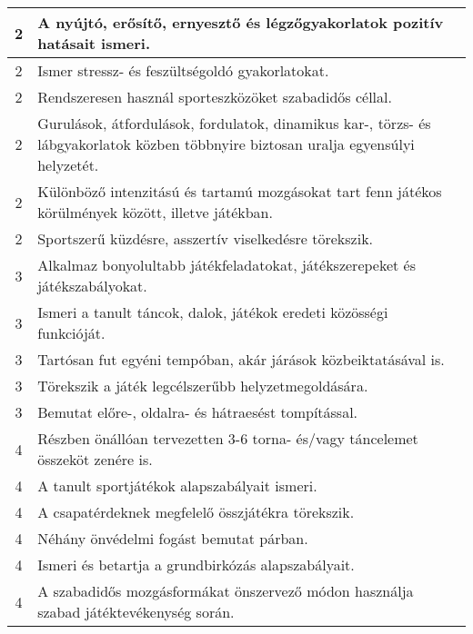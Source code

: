 \begin{longtable}{c | p{} }
                                
                                          2 &  A nyújtó, erősítő, ernyesztő és légzőgyakorlatok pozitív hatásait ismeri. \\ \hline
                                          2 &  Ismer stressz- és feszültségoldó gyakorlatokat. \\ \hline
                                          2 &  Rendszeresen használ sporteszközöket szabadidős céllal. \\ \hline
                                          2 &  Gurulások, átfordulások, fordulatok, dinamikus kar-, törzs- és lábgyakorlatok közben többnyire biztosan uralja egyensúlyi helyzetét. \\ \hline
                                          2 &  Különböző intenzitású és tartamú mozgásokat tart fenn játékos körülmények között, illetve játékban. \\ \hline
                                          2 &  Sportszerű küzdésre, asszertív viselkedésre törekszik. \\ \hline
                                      
                                
                                          3 &  Alkalmaz bonyolultabb játékfeladatokat, játékszerepeket és játékszabályokat. \\ \hline
                                          3 &  Ismeri a tanult táncok, dalok, játékok eredeti közösségi funkcióját. \\ \hline
                                          3 &  Tartósan fut egyéni tempóban, akár járások közbeiktatásával is. \\ \hline
                                          3 &  Törekszik a játék legcélszerűbb helyzetmegoldására. \\ \hline
                                          3 &  Bemutat előre-, oldalra- és hátraesést tompítással. \\ \hline
                                      
                                
                                          4 &  Részben önállóan tervezetten 3-6 torna- és/vagy táncelemet összeköt zenére is. \\ \hline
                                          4 &  A tanult sportjátékok alapszabályait ismeri. \\ \hline
                                          4 &  A csapatérdeknek megfelelő összjátékra törekszik. \\ \hline
                                          4 &  Néhány önvédelmi fogást bemutat párban. \\ \hline
                                          4 &  Ismeri és betartja a grundbirkózás alapszabályait. \\ \hline
                                          4 &  A szabadidős mozgásformákat önszervező módon használja szabad játéktevékenység során. \\ \hline
                                      
                        \end{longtable}
            \clearpage

